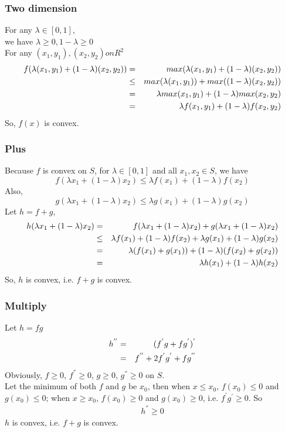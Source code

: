 \documentclass[english,11pt]{article}
\begin{document}
\subsubsection{Two dimension}
For any $ \lambda\in[0,1] $,\\
we have $ \lambda \geq 0,  1 - \lambda \geq 0$ \\
For any $(x_{1}, y_{1}), (x_{2}, y_{2}) on R^{2}$
\begin{eqnarray}
f(\lambda(x_{1}, y_{1}) + (1-\lambda)(x_{2}, y_{2})) & = & max(\lambda(x_{1}, y_{1}) + (1-\lambda)(x_{2}, y_{2})) \notag \\
& \leq & max(\lambda(x_{1}, y_{1})) + max((1-\lambda)(x_{2}, y_{2})) \notag \\
& = & \lambda max(x_{1},y_{1}) + (1- \lambda)max(x_{2}, y_{2}) \notag \\
& = & \lambda f(x_{1}, y_{1}) + (1-\lambda)f(x_{2}, y_{2}) 
\end{eqnarray}
So, $f(x)$ is convex.
\subsubsection{Plus}
Because $f$ is convex on $S$, for $\lambda \in [0,1]$ and all $x_{1}, x_{2} \in S$, we have \\
\begin{equation}
f(\lambda x_{1} + (1-\lambda) x_{2}) \leq \lambda f(x_{1}) + (1 - \lambda)f(x_{2}) 
\end{equation}
Also, \\ 
\begin{equation}
g(\lambda x_{1} + (1-\lambda) x_{2}) \leq \lambda g(x_{1}) + (1 - \lambda)g(x_{2})
\end{equation}
Let $h = f + g$,
\begin{eqnarray}
h(\lambda x_{1} + (1-\lambda) x_{2}) & = & f(\lambda x_{1} + (1-\lambda) x_{2}) +  g(\lambda x_{1} + (1-\lambda) x_{2}) \notag \\
& \leq & \lambda f(x_{1}) + (1 - \lambda)f(x_{2}) + \lambda g(x_{1}) + (1 - \lambda)g(x_{2}) \notag \\
& = & \lambda (f(x_{1}) + g(x_{1})) + (1 - \lambda)(f(x_{2}) + g(x_{2}))\notag \\
& = & \lambda h(x_{1}) + (1-\lambda)h(x_{2})
\end{eqnarray}
So, $h$ is convex, i.e. $f+g$ is convex.
\subsubsection{Multiply}
Let $h = fg$
\begin{eqnarray}
h^{''} & = & (f^{'}g + fg^{'})^{'}  \notag \\
& = & f^{''} + 2f^{'}g^{'} + fg^{''} 
\end{eqnarray}
Obviously, $f \geq 0$, $f^{''} \geq 0$, $g \geq 0$, $g^{''} \geq 0$ on $S$.\\
Let the minimum of both $f$ and $g$ be $x_{0}$, then when $x \leq x_{0}$,
$f(x_{0}) \leq 0$ and $g(x_{0}) \leq 0$; 
when $x \geq x_{0}$, $f(x_{0}) \geq 0$ and $g(x_{0}) \geq 0$, i.e. $f^{'}g^{'} \geq 0$. So 
\begin{eqnarray}
h^{''} \geq 0
\end{eqnarray} 
$h$ is convex, i.e. $f + g$ is convex.
\end{document}

